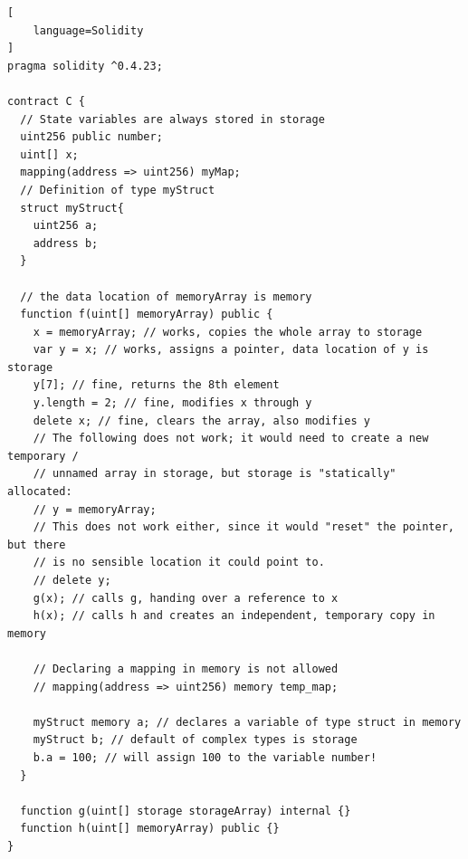 \documentclass[a4paper]{article}
\begin{document}
\begin{lstlisting}[
    language=Solidity
]
pragma solidity ^0.4.23;

contract C {
  // State variables are always stored in storage
  uint256 public number;
  uint[] x; 
  mapping(address => uint256) myMap;
  // Definition of type myStruct
  struct myStruct{
    uint256 a;
    address b;
  }

  // the data location of memoryArray is memory
  function f(uint[] memoryArray) public {
    x = memoryArray; // works, copies the whole array to storage
    var y = x; // works, assigns a pointer, data location of y is storage
    y[7]; // fine, returns the 8th element
    y.length = 2; // fine, modifies x through y
    delete x; // fine, clears the array, also modifies y
    // The following does not work; it would need to create a new temporary /
    // unnamed array in storage, but storage is "statically" allocated:
    // y = memoryArray;
    // This does not work either, since it would "reset" the pointer, but there
    // is no sensible location it could point to.
    // delete y;
    g(x); // calls g, handing over a reference to x
    h(x); // calls h and creates an independent, temporary copy in memory
    
    // Declaring a mapping in memory is not allowed
    // mapping(address => uint256) memory temp_map;
    
    myStruct memory a; // declares a variable of type struct in memory
    myStruct b; // default of complex types is storage
    b.a = 100; // will assign 100 to the variable number!
  }

  function g(uint[] storage storageArray) internal {}
  function h(uint[] memoryArray) public {}
}
\end{lstlisting}
\end{document}
